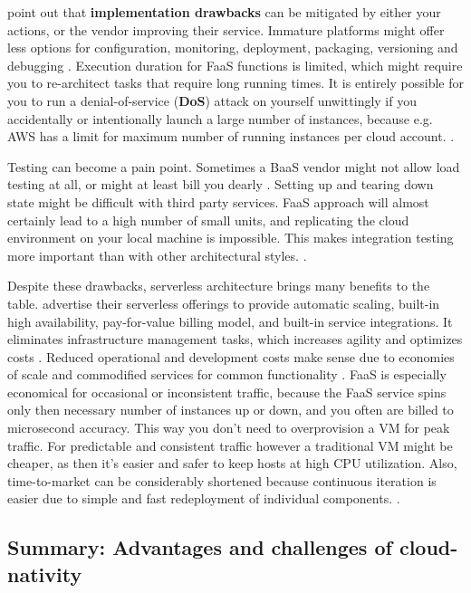 \documentclass[utf8,english]{gradu3}
\begin{document}
\textcite{Roberts2018} point out that \textbf{implementation drawbacks} can be
mitigated by either your actions, or the vendor improving their service.
Immature platforms might offer less options for configuration, monitoring,
deployment, packaging, versioning and debugging \parencite{Roberts2018}.
Execution duration for FaaS functions is limited, which might require you to
re-architect tasks that require long running times. It is entirely possible for
you to run a denial-of-service (\textbf{DoS}) attack on yourself unwittingly if
you accidentally or intentionally launch a large number of instances, because
e.g.  AWS has a limit for maximum number of running instances per cloud account.
\parencite{Roberts2018}.

Testing can become a pain point. Sometimes a BaaS vendor might not allow load
testing at all, or might at least bill you dearly \parencite{Roberts2018}.
Setting up and tearing down state might be difficult with third party services.
FaaS approach will almost certainly lead to a high number of small units, and
replicating the cloud environment on your local machine is impossible. This
makes integration testing more important than with other architectural styles.
\parencite{Roberts2018}.

Despite these drawbacks, serverless architecture brings many benefits to the
table. \textcite{AWS-serverless} advertise their serverless offerings to provide
automatic scaling, built-in high availability, pay-for-value billing model, and
built-in service integrations. It eliminates infrastructure management tasks,
which increases agility and optimizes costs \parencite{AWS-serverless}. Reduced
operational and development costs make sense due to economies of scale and
commodified services for common functionality \parencite{Roberts2018}. FaaS is
especially economical for occasional or inconsistent traffic, because the FaaS
service spins only then necessary number of instances up or down, and you often
are billed to microsecond accuracy. This way you don't need to overprovision a
VM for peak traffic. For predictable and consistent traffic however a
traditional VM might be cheaper, as then it's easier and safer to keep hosts at
high CPU utilization. Also, time-to-market can be considerably shortened because
continuous iteration is easier due to simple and fast redeployment of individual
components. \parencite{Roberts2018}.


\subsection{Summary: Advantages and challenges of cloud-nativity}
\end{document}
